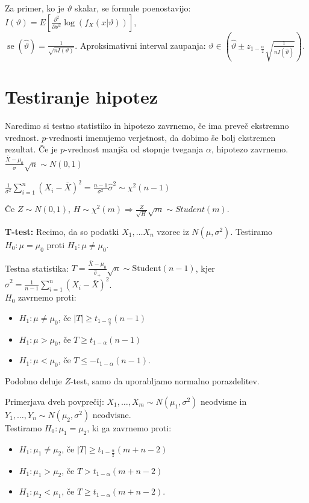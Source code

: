 \documentclass[11pt,a4paper]{amsart}
\theoremstyle{definition} %
\theoremstyle{plain} %
\DeclareMathOperator{\se}{se}
\begin{document}
Za primer, ko je $\vartheta$ skalar, se formule poenostavijo:
$I(\vartheta) = E[\frac{\partial^2}{\partial\vartheta^2}
\log(f_X(x|\vartheta))]$, \\
$\se(\hat{\vartheta}) = \frac{1}{\sqrt{n I(\vartheta)}}$.
Aproksimativni interval zaupanja: $\vartheta \in \left( \hat{\vartheta} \pm z_{1-\frac{\alpha}{2}}
\sqrt{\frac{1}{nI(\hat{\vartheta})}}\right)$.

\section*{Testiranje hipotez}
Naredimo si testno statistiko in hipotezo zavrnemo, če ima preveč ekstremno
vrednost. $p$-vrednosti imenujemo verjetnost, da dobimo še bolj ekstremen
rezultat. Če je $p$-vrednost manjša od stopnje tveganja $\alpha$, hipotezo
zavrnemo.
$\frac{\overline{X}-\mu_0}{\sigma} \sqrt{n} \sim N(0,1)$

$\frac{1}{\sigma^2}\sum_{i=1}^n (X_i - \overline{X})^2 =
\frac{n-1}{\sigma^2}\hat{\sigma}^2 \sim \chi^2 (n-1)$

Če $Z \sim N(0,1)$, $H \sim \chi^2(m) \Longrightarrow \frac{Z}{\sqrt{H}}\sqrt{m}
\sim Student(m)$.

\textbf{T-test:}
Recimo, da so podatki $X_1, \dots X_n$ vzorec iz $N(\mu, \sigma^2)$.
Testiramo $H_0: \mu = \mu_0$ proti $H_1: \mu \neq \mu_0$.

Testna statistika: $T = \frac{\overline{X} - \mu_0}{\widehat{\sigma}_+}\sqrt{n} \sim
\text{Student}(n-1)$, kjer $\hat{\sigma}^2 = \frac{1}{n-1} \sum_{i=1}^n(X_i -
\bar{X})^2$. \\
$H_0$ zavrnemo proti:
\begin{itemize}
  \item $H_1: \mu \neq \mu_0$, če $|T| \geq t_{1-\frac{\alpha}{2}}(n-1)$
  \item $H_1: \mu > \mu_0$, če $T \geq t_{1-\alpha}(n-1)$
  \item $H_1: \mu < \mu_0$, če $T \leq -t_{1-\alpha}(n-1)$.
\end{itemize}

Podobno deluje $Z$-test, samo da uporabljamo normalno porazdelitev.

Primerjava dveh povprečij:
$X_1, \ldots ,X_m \sim N(\mu_1, \sigma^2)$ neodvisne in $Y_1, \ldots ,Y_n \sim
N(\mu_2 , \sigma^2)$ neodvisne. \\
Testiramo $H_0: \mu_1 = \mu_2$, ki ga zavrnemo proti:
\begin{itemize}
  \item $H_1: \mu_1 \neq \mu_2$, če $|T| \geq t_{1-\frac{\alpha}{2}}(m+n-2)$
  \item $H_1: \mu_1 > \mu_2$, če $T > t_{1-\alpha}(m+n-2)$
  \item $H_1: \mu_2 < \mu_1$, če $T \geq t_{1-\alpha}(m+n-2)$.
\end{itemize}
\end{document}
